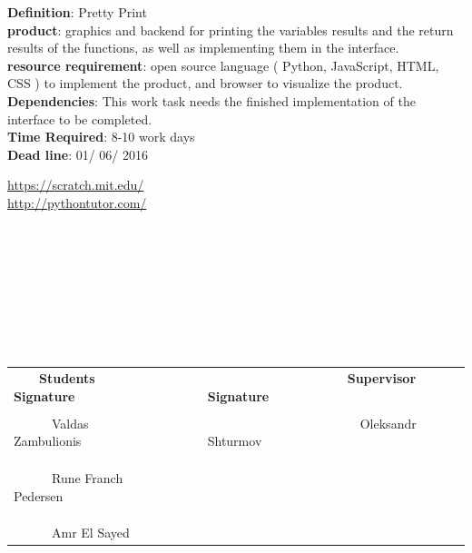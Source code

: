 \documentclass[11pt]{article}
\begin{document}
\noindent\textbf{Definition}:  Pretty Print\\
\textbf{product}: graphics and backend for printing the variables results and the return results of the functions, as well as implementing them in the interface.\\
\textbf{resource requirement}: open source language ( Python, JavaScript, HTML, CSS ) to implement the product, and browser to visualize the product. \\
\textbf{Dependencies}: This work task needs the finished implementation of the interface to be completed.\\
\textbf{Time Required}: 8-10 work days\\
\textbf{Dead line}: 01/ 06/ 2016\\




\nocite{Guo:2013:OPT:2445196.2445368}
\nocite{foutsitzis2010teaching}
\url{https://scratch.mit.edu/}\\
\url{http://pythontutor.com/}\\\\\\\\\\\\\\\\\\
\begin{tabular}{ l l l c r l l l}
~\ ~\ \textbf{Students Signature} & & & & & & ~\ ~\ ~\ ~\ ~\ ~\ ~\ ~\ ~\ ~\ ~\ \textbf{Supervisor Signature}\\\\
~\ ~\ ~\ Valdas Zambulionis & & & & & & ~\ ~\ ~\ ~\ ~\ ~\ ~\ ~\ ~\ ~\ ~\ ~\ Oleksandr Shturmov\\\\\\\\
~\ ~\ ~\ Rune Franch Pedersen & & & & & & \\\\\\\\
~\ ~\ ~\ Amr El Sayed & & & & & &
\end{tabular}
\end{document}
